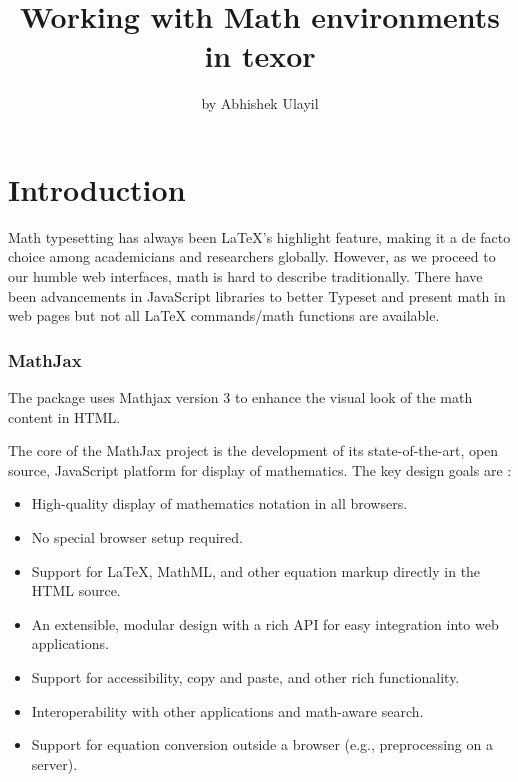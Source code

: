 \title{Working with Math environments in texor}
\author{by Abhishek Ulayil}

\maketitle


\section{Introduction}
Math typesetting has always been LaTeX’s highlight feature, making it a de facto choice among academicians and researchers globally. However, as we proceed to our humble web interfaces, math is hard to describe traditionally. There have been advancements in JavaScript libraries to better Typeset and present math in web pages but not all LaTeX commands/math functions are available.

\subsubsection{MathJax}
The  package uses Mathjax version 3 to enhance the visual look of the math content in HTML.

The core of the MathJax project is the development of its state-of-the-art, open source, JavaScript platform for display of mathematics. The key design goals are \citep{mathjax}:
\begin{itemize}
    \item High-quality display of mathematics notation in all browsers.
    \item No special browser setup required.
    \item Support for LaTeX, MathML, and other equation markup directly in the HTML source.
    \item An extensible, modular design with a rich API for easy integration into web applications.
    \item Support for accessibility, copy and paste, and other rich functionality.
    \item Interoperability with other applications and math-aware search.
    \item Support for equation conversion outside a browser (e.g., preprocessing on a server).
\end{itemize}

